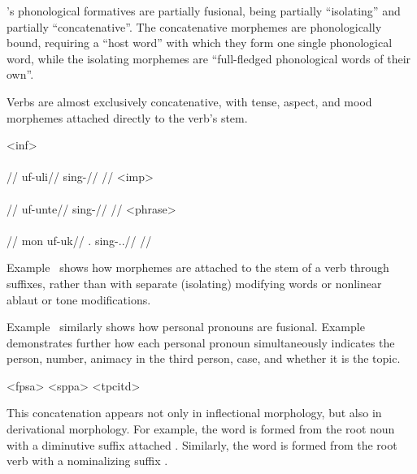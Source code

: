 \langtvk's phonological formatives are partially fusional, being partially \enquote{isolating} and partially \enquote{concatenative}\autocite{wals-20}. The concatenative morphemes are phonologically bound, requiring a \enquote{host word} with which they form one single phonological word, while the isolating morphemes are \enquote{full-fledged phonological words of their own}.

Verbs are almost exclusively concatenative, with tense, aspect, and mood morphemes attached directly to the verb's stem.

	\a<inf>\begingl
		\glpreamble{}\\
		\\
		//
		\gla uf-uli//
		\glb sing-\Inf//
		\glft{}//
	\endgl
	\a<imp>\begingl
		\glpreamble{}\\
		\\
		//
		\gla uf-unte//
		\glb sing-\Imp//
		\glft{}//
	\endgl
	\a<phrase>\begingl
		\glpreamble{}\\
		\\
		//
		\gla mon uf-uk//
		\glb \Fps.\Top{} sing-\Ind.\Pst.\Pfv//
	\glft{}//
	\endgl
\xe

Example~ shows how morphemes are attached to the stem of a verb through suffixes, rather than with separate (isolating) modifying words or nonlinear ablaut or tone modifications.

Example~ similarly shows how personal pronouns are fusional. Example~ demonstrates further how each personal pronoun simultaneously indicates the person, number, animacy in the third person, case, and whether it is the topic.

	\a<fpsa>     
	\a<sppa>     
	\a<tpcitd>     
\xe

This concatenation appears not only in inflectional morphology, but also in derivational morphology. For example, the word     is formed from the root noun     with a diminutive suffix attached . Similarly, the word     is formed from the root verb     with a nominalizing suffix .


